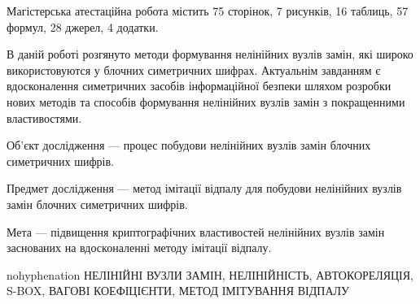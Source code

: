 
Магістерська атестаційна робота містить 75 сторінок, 7 рисунків, 16 таблиць,
57 формул, 28 джерел, 4 додатки.

В даній роботі розгянуто методи формування нелінійних вузлів замін, які широко
використовуются у блочних симетричних шифрах. Актуальнім завданням є
вдосконалення симетричних засобів інформаційної безпеки шляхом розробки нових
методів та способів формування нелінійних вузлів замін з покращенними
властивостями.

Об’єкт дослідження --- процес побудови нелінійних вузлів замін блочних
симетричних шифрів.

Предмет дослідження --- метод імітації відпалу для побудови нелінійних вузлів
замін блочних симетричних шифрів.

Мета --- підвищення криптографічних властивостей нелінійних вузлів замін
заснованих на вдосконаленні методу імітації відпалу.

\bigskip\bigskip

\begin{hyphenrules}{nohyphenation}
НЕЛІНІЙНІ ВУЗЛИ ЗАМІН, НЕЛІНІЙНІСТЬ, АВТОКОРЕЛЯЦІЯ, S-BOX, ВАГОВІ КОЕФІЦІЄНТИ,
МЕТОД ІМІТУВАННЯ ВІДПАЛУ
\end{hyphenrules}
